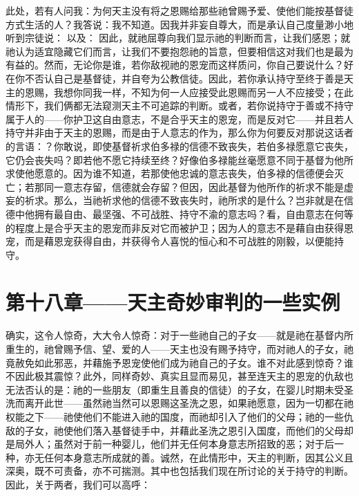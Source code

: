 此处，若有人问我：为何天主没有将之恩赐给那些祂曾赐予爱、使他们能按基督徒方式生活的人？我答说：我不知道。因我并非妄自尊大，而是承认自己度量渺小地听到宗徒说： 以及： 因此，就祂屈尊向我们显示祂的判断而言，让我们感恩；就祂认为适宜隐藏它们而言，让我们不要抱怨祂的旨意，但要相信这对我们也是最为有益的。然而，无论你是谁，若你敌视祂的恩宠而这样质问，你自己要说什么？好在你不否认自己是基督徒，并自夸为公教信徒。因此，若你承认持守至终于善是天主的恩赐，我想你同我一样，不知为何一人应接受此恩赐而另一人不应接受；在此情形下，我们俩都无法窥测天主不可追踪的判断。或者，若你说持守于善或不持守属于人的——你护卫这自由意志，不是合乎天主的恩宠，而是反对它——并且若人持守并非由于天主的恩赐，而是由于人意志的作为，那么你为何要反对那说这话者的言语：？你敢说，即使基督祈求伯多禄的信德不致丧失，若伯多禄愿意它丧失，它仍会丧失吗？即若他不愿它持续至终？好像伯多禄能丝毫愿意不同于基督为他所求使他愿意的。因为谁不知道，若那使他忠诚的意志丧失，伯多禄的信德便会灭亡；若那同一意志存留，信德就会存留？但因，因此基督为他所作的祈求不能是虚妄的祈求。那么，当祂祈求他的信德不致丧失时，祂所求的是什么？岂非就是在信德中他拥有最自由、最坚强、不可战胜、持守不渝的意志吗？看，自由意志在何等的程度上是合乎天主的恩宠而非反对它而被护卫；因为人的意志不是藉自由获得恩宠，而是藉恩宠获得自由，并获得令人喜悦的恒心和不可战胜的刚毅，以便能持守。\par


\section{第十八章——天主奇妙审判的一些实例}

确实，这令人惊奇，大大令人惊奇：对于一些祂自己的子女——就是祂在基督内所重生的，祂曾赐予信、望、爱的人——天主也没有赐予持守，而对祂人的子女，祂竟赦免如此邪恶，并藉施予恩宠使他们成为祂自己的子女。谁不对此感到惊奇？谁不因此极其震惊？此外，同样奇妙、真实且显而易见，甚至连天主的恩宠的仇敌也无法否认的是：祂的一些朋友（即重生且善良的信徒）的子女，在婴儿时期未受圣洗而离开此世——虽然祂当然可以恩赐这圣洗之恩，如果祂愿意，因为一切都在祂权能之下——祂使他们不能进入祂的国度，而祂却引入了他们的父母；祂的一些仇敌的子女，祂使他们落入基督徒手中，并藉此圣洗之恩引入国度，而他们的父母却是局外人；虽然对于前一种婴儿，他们并无任何本身意志所招致的恶；对于后一种，亦无任何本身意志所成就的善。诚然，在此情形中，天主的判断，因其公义且深奥，既不可责备，亦不可揣测。其中也包括我们现在所讨论的关于持守的判断。因此，关于两者，我们可以高呼：\par

